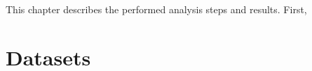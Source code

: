 
This chapter describes the performed analysis steps and results.
First, 

\section{Datasets}
\label{s:analysis-datasets}



